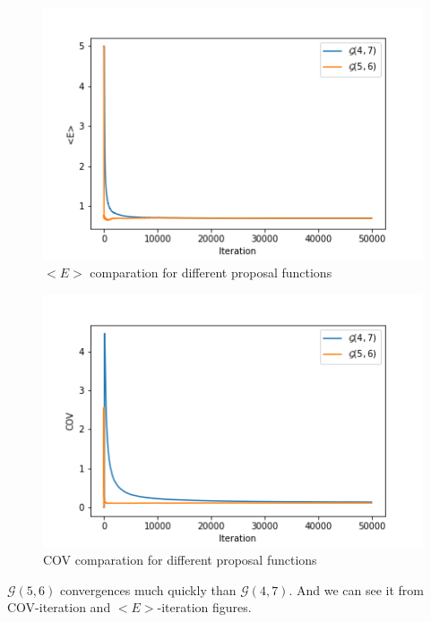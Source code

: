 \documentclass{article}
\begin{document}
\begin{figure}[h!]
\centering
\includegraphics[scale=0.45]{h4p3bEcompare.png}
\caption{ $<E>$ comparation for different proposal functions}
\end{figure}

\begin{figure}[h!]
\centering
\includegraphics[scale=0.45]{h4p3bCOVcompare.png}
\caption{ COV comparation for different proposal functions}
\end{figure}

$\mathcal{G}(5,6)$ convergences much quickly than $\mathcal{G}(4,7)$. And we can see it from COV-iteration and $<E>$-iteration figures.
\\
\\
\\
\\
\\
\\
\\
\\
\\
\\
\\
\\
\\
\\
\\
\end{document}
